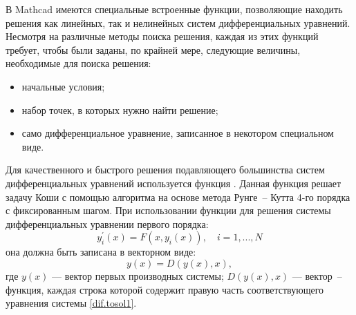 В Mathcad имеются специальные встроенные функции, позволяющие находить решения как линейных, так и нелинейных систем дифференциальных уравнений. Несмотря на различные методы поиска решения, каждая из этих функций требует, чтобы были заданы, по крайней мере, следующие величины, необходимые для поиска решения:
\begin{itemize}
	\item начальные условия; 
	\item набор точек, в которых нужно найти решение;
	\item само дифференциальное уравнение, записанное в некотором специальном виде.
\end{itemize}
Для качественного и быстрого решения подавляющего большинства систем дифференциальных уравнений используется функция . Данная функция решает задачу Коши с помощью алгоритма на основе метода Рунге~-- Кутта 4-го порядка с фиксированным шагом.
При использовании функции  для решения системы дифференциальных уравнении первого порядка:
\begin{equation}\label{dif.tosol1}
	y_i^{\prime}(x)=F(x,y_i(x)),\quad i=1, ... ,N
\end{equation}
она должна быть записана в векторном виде:
\begin{equation}\label{dif.tosol2}
	y(x)=D(y(x),x),
\end{equation}
где $y(x)$ --- вектор первых производных системы; $D(y(x),x)$ --- вектор~-- функция, каждая строка которой содержит правую часть соответствующего уравнения системы \ref{dif.tosol1}.

